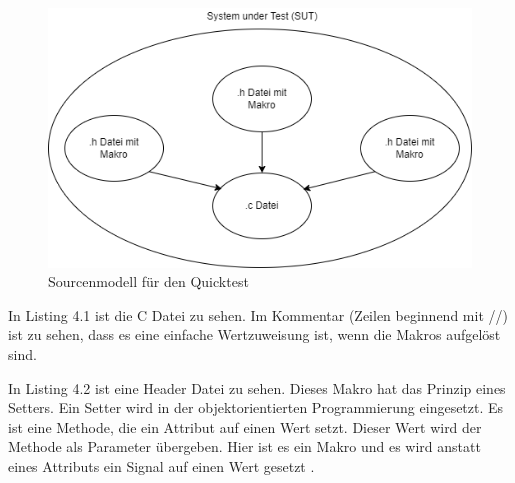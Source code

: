 \begin{figure}[h]
\centering
\includegraphics[scale=.6,]{Bilder/Quicktest/Makros.drawio.png}
\caption{Sourcenmodell für den Quicktest}
\end{figure}


In Listing 4.1 ist die C Datei zu sehen. Im Kommentar (Zeilen beginnend mit //) ist zu sehen, 
dass es eine einfache Wertzuweisung ist, wenn die Makros aufgelöst sind.\par

In Listing 4.2 ist eine Header Datei zu sehen. Dieses Makro hat das Prinzip eines Setters. Ein Setter wird in der
objektorientierten Programmierung eingesetzt. Es ist eine Methode, die ein Attribut auf einen Wert setzt. Dieser Wert
wird der Methode als Parameter übergeben. Hier ist es ein Makro und es wird anstatt eines Attributs ein Signal auf einen
Wert gesetzt \parencite[S. 414 f.]{java}.

